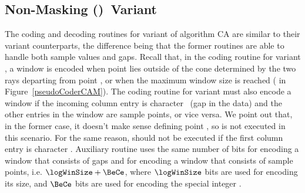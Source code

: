 \vspace{+5pt}




\vspace{-10pt}
\subsection{Non-Masking (\NOmaskalgo)\ Variant}
\label{algo:ca:nmvariant}


The coding and decoding routines for variant \NOmaskalgo of algorithm CA are similar to their variant \maskalgo counterparts, the difference being that the former routines are able to handle both sample values and gaps. Recall that, in the coding routine for variant \maskalgo, a window is encoded when point \incoming lies outside of the cone determined by the two rays departing from point \archived, or when the maximum window size is reached ( in Figure~\ref{pseudoCoderCAM}). The coding routine for variant \NOmaskalgo must also encode a window if the incoming column entry is character \noData\ (gap in the data) and the other entries in the window are sample points, or vice versa. We point out that, in the former case, it doesn't make sense defining point \archived, so  is not executed in this scenario. For the same reason,  should not be executed if the first column entry is character \noData. Auxiliary routine \CAWinEnd uses the same number of bits for encoding a window that consists of gaps and for encoding a window that consists of sample points, i.e. $\logWinSize+\BeCe$, where $\logWinSize$ bits are used for encoding its size, and $\BeCe$ bits are used for encoding the special integer \nodata. 


